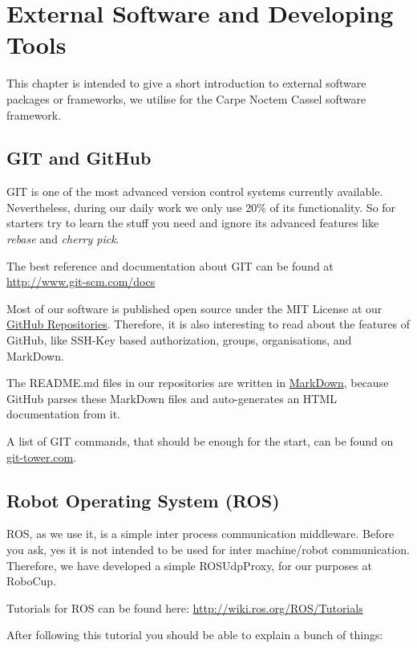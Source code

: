 \chapter{External Software and Developing Tools}
\label{chap:ExtSoftware}

This chapter is intended to give a short introduction to external software packages or frameworks, we utilise for the Carpe Noctem Cassel software framework.

\section{GIT and GitHub}
\label{sec:Git}

GIT is one of the most advanced version control systems currently available. Nevertheless, during our daily work we only use 20\% of its functionality. So for starters try to learn the stuff you need and ignore its advanced features like \emph{rebase} and \emph{cherry pick}.

The best reference and documentation about GIT can be found at \url{http://www.git-scm.com/docs}

Most of our software is published open source under the MIT License at our \href{https://github.com/carpe-noctem-cassel}{GitHub Repositories}. Therefore, it is also interesting to read about the features of GitHub, like SSH-Key based authorization, groups, organisations, and MarkDown.

The README.md files in our repositories are written in \href{https://en.wikipedia.org/wiki/Markdown}{MarkDown}, because GitHub parses these MarkDown files and auto-generates an HTML documentation from it.

A list of GIT commands, that should be enough for the start, can be found on \href{https://www.git-tower.com/blog/git-cheat-sheet/}{git-tower.com}.

\section{Robot Operating System (ROS)}
\label{sec:ROS}

ROS, as we use it, is a simple inter process communication middleware. Before you ask, yes it is not intended to be used for inter machine/robot communication. Therefore, we have developed a simple ROSUdpProxy, for our purposes at RoboCup. 

Tutorials for ROS can be found here: \url{http://wiki.ros.org/ROS/Tutorials}

After following this tutorial you should be able to explain a bunch of things:

